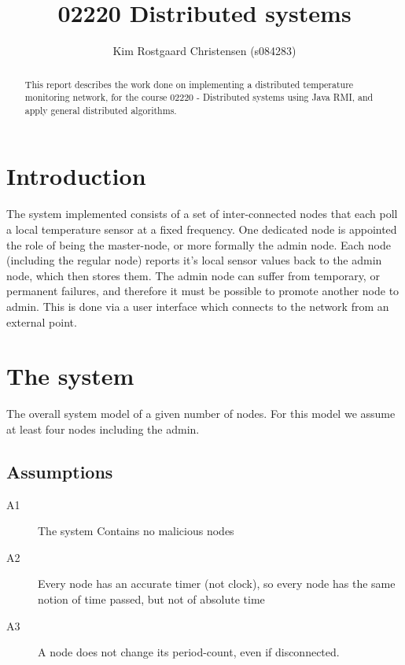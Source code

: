\documentclass[10pt,a4paper]{article}
\begin{document}
\def\File#1{\textsf{#1}}
\def\Code#1{\texttt{#1}}
\def\Key#1{\textsf{#1}}

\title{02220 Distributed systems}
\author{Kim Rostgaard Christensen (s084283)}

\maketitle

\tableofcontents

\begin{abstract}
This report describes the work done on implementing a distributed temperature monitoring network, for the course 02220 - Distributed systems using Java RMI, and apply general distributed algorithms.
\end{abstract}

\section{Introduction}
The system implemented consists of a set of inter-connected nodes that each poll a local temperature sensor at a fixed frequency. One dedicated node is appointed the role of being the master-node, or more formally the admin node. Each node (including the regular node) reports it's local sensor values back to the admin node, which then stores them.
The admin node can suffer from temporary, or permanent failures, and therefore it must be possible to promote another node to admin. This is done via a user interface which connects to the network from an external point.

\section{The system}

The overall system model of a given number of nodes. For this model we assume at least four nodes including the admin.

\subsection{Assumptions}

\begin{description}
 \item[A1] The system Contains no malicious nodes
 \item[A2] Every node has an accurate timer (not clock), so every node has the same notion of time passed, but not of absolute time
 \item[A3] A node does not change its period-count, even if disconnected.
\end{description} 
\end{document}
